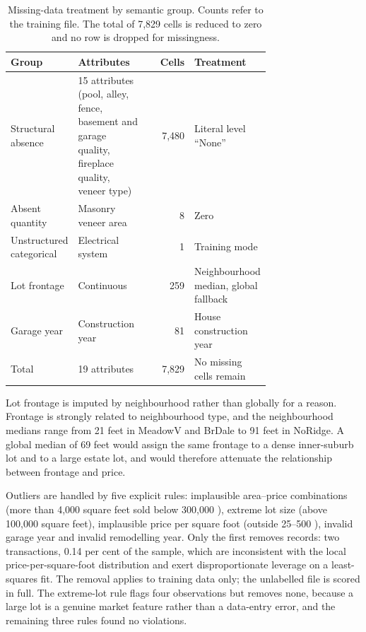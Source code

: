 \begin{table}[htbp]
\centering
\caption{Missing-data treatment by semantic group. Counts refer to the training file.
The total of 7,829 cells is reduced to zero and no row is dropped for missingness.}
\label{tab:cleaning}
\small
\begin{tabularx}{\linewidth}{@{}L{0.22\linewidth}L{0.27\linewidth}rL{0.24\linewidth}@{}}
\toprule
\textbf{Group} & \textbf{Attributes} & \textbf{Cells} & \textbf{Treatment} \\
\midrule
Structural absence & 15 attributes (pool, alley, fence, basement and garage quality, fireplace quality, veneer type) & 7,480 & Literal level ``None'' \\
Absent quantity & Masonry veneer area & 8 & Zero \\
Unstructured categorical & Electrical system & 1 & Training mode \\
Lot frontage & Continuous & 259 & Neighbourhood median, global fallback \\
Garage year & Construction year & 81 & House construction year \\
\midrule
Total & 19 attributes & 7,829 & No missing cells remain \\
\bottomrule
\end{tabularx}
\end{table}

Lot frontage is imputed by neighbourhood rather than globally for a reason. Frontage
is strongly related to neighbourhood type, and the neighbourhood medians range from
21 feet in MeadowV and BrDale to 91 feet in NoRidge. A global median of 69 feet would
assign the same frontage to a dense inner-suburb lot and to a large estate lot, and
would therefore attenuate the relationship between frontage and price.

Outliers are handled by five explicit rules: implausible area--price combinations
(more than 4,000 square feet sold below 300,000 \USD), extreme lot size (above
100,000 square feet), implausible price per square foot (outside 25--500 \USD),
invalid garage year and invalid remodelling year. Only the first removes records: two
transactions, 0.14 per cent of the sample, which are inconsistent with the local
price-per-square-foot distribution and exert disproportionate leverage on a
least-squares fit. The removal applies to training data only; the unlabelled file is
scored in full. The extreme-lot rule flags four observations but removes none,
because a large lot is a genuine market feature rather than a data-entry error, and
the remaining three rules found no violations.

